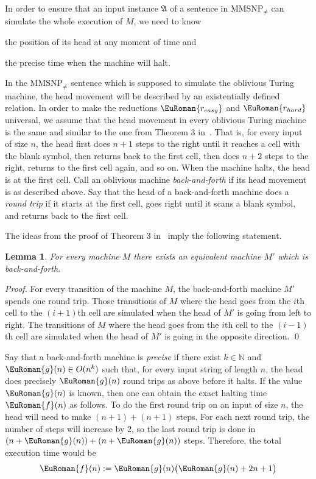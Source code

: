 \documentclass[10pt,a4paper]{amsart}
\theoremstyle{plain}
\newtheorem{lem}[thm]{Lemma}
\theoremstyle{definition}
\numberwithin{equation}{section}
\renewcommand{\proof}[1][Proof]{\par\noindent\textit{#1.}\enspace\ignorespaces}
\newcommand{\eurm}[1]{\EuRoman{#1}} %
\newcommand{\structure}[1]{\mathfrak{#1}} %
\newcommand{\func}[1]{\eurm{#1}}  %
\newcommand{\MMSNPineq}[0]{\ensuremath{\textrm{MMSNP}_{\not=}}}
\begin{document}
In order to ensure that an input instance $\structure{A}$ of a sentence in $\MMSNPineq$ can simulate the whole execution of $M$, we need to know
\begin{inparaenum}[(a)] \item the position of its head at any moment of time and \item the precise time when the machine will halt.
\end{inparaenum}

In the $\MMSNPineq$ sentence which is supposed to simulate the oblivious Turing machine, the head movement will be described by an existentially defined relation.
In order to make the reductions $\func{r_{easy}}$ and $\func{r_{hard}}$ universal, we assume that the head movement in every oblivious Turing machine is the same and similar to the one from Theorem 3 in~\cite{pippenger1979}.
That is, for every input of size $n$, the head first does $n+1$ steps to the right until it reaches a cell with the blank symbol, then returns back to the first cell, then does $n+2$ steps to the right, returns to the first cell again, and so on. 
When the machine halts, the head is at the first cell. 
Call an oblivious machine \emph{back-and-forth} if its head movement is as described above. 
Say that the head of a back-and-forth machine does a \emph{round trip} if it starts at the first cell, goes right until it scans a blank symbol, and returns back to the first cell. 

The ideas from the proof of Theorem 3 in~\cite{pippenger1979} imply the following statement.

\begin{lem}\label{lem:pippenger}
For every machine $M$ there exists an equivalent machine $M'$ which is back-and-forth.
\end{lem}
\proof
For every transition of the machine $M$, the back-and-forth machine $M'$ spends one round trip. Those transitions of $M$ where the head goes from the $i$th cell to the $(i+1)$th cell are simulated when the head of $M'$ is going from left to right. The transitions of $M$ where the head goes from the $i$th cell to the $(i-1)$th cell are simulated when the head of $M'$ is going in the opposite direction.
\qed

\medskip

Say that a back-and-forth machine is \emph{precise} if there exist $k\in\mathbb{N}$ and $\func{g}(n)\in O(n^k)$ such that, for every input string of length $n$, the head does precisely $\func{g}(n)$ round trips as above before it halts. 
If the value $\func{g}(n)$ is known, then one can obtain the exact halting time $\func{f}(n)$ as follows.
To do the first round trip on an input of size $n$, the head will need to make $(n+1)+(n+1)$ steps.
For each next round trip, the number of steps will increase by 2, so the last round trip is done in $(n+\func{g}(n))+(n+\func{g}(n))$ steps.
Therefore, the total execution time would be
\begin{equation*}
\func{f}(n) := \func{g}(n)\bigl(\func{g}(n)+2n+1\bigr)
\end{equation*}
\end{document}
